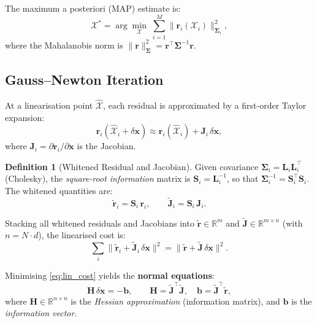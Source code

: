 \documentclass[11pt,a4paper]{article}
\newcommand{\bx}{\bm{x}}
\newcommand{\br}{\bm{r}}
\newcommand{\bb}{\bm{b}}
\newcommand{\bJ}{\bm{J}}
\newcommand{\bH}{\bm{H}}
\newcommand{\bSigma}{\bm{\Sigma}}
\newcommand{\R}{\mathbb{R}}
\theoremstyle{definition}
\newtheorem{definition}{Definition}[section]
\theoremstyle{plain}
\begin{document}
The maximum a posteriori (MAP) estimate is:
\begin{equation}
  \mathcal{X}^* = \arg\min_{\mathcal{X}} \;
    \sum_{i=1}^{M} \bigl\| \br_i(\mathcal{X}_i) \bigr\|^2_{\bSigma_i},
  \label{eq:map}
\end{equation}
where the Mahalanobis norm is
$\|\br\|^2_{\bSigma} = \br^\top \bSigma^{-1} \br$.

\subsection{Gauss--Newton Iteration}

At a linearisation point $\hat{\mathcal{X}}$, each residual is approximated
by a first-order Taylor expansion:
\begin{equation}
  \br_i(\hat{\mathcal{X}}_i + \delta\bx)
    \approx \br_i(\hat{\mathcal{X}}_i) + \bJ_i \, \delta\bx,
\end{equation}
where $\bJ_i = \partial \br_i / \partial \bx$ is the Jacobian.

\begin{definition}[Whitened Residual and Jacobian]
  Given covariance $\bSigma_i = \bm{L}_i \bm{L}_i^\top$ (Cholesky),
  the \emph{square-root information} matrix is
  $\bm{S}_i = \bm{L}_i^{-1}$, so that
  $\bSigma_i^{-1} = \bm{S}_i^\top \bm{S}_i$.
  The whitened quantities are:
  \begin{equation}
    \tilde{\br}_i = \bm{S}_i \, \br_i, \qquad
    \tilde{\bJ}_i = \bm{S}_i \, \bJ_i.
  \end{equation}
\end{definition}

Stacking all whitened residuals and Jacobians into $\tilde{\br} \in \R^m$
and $\tilde{\bJ} \in \R^{m \times n}$ (with $n = N \cdot d$), the
linearised cost is:
\begin{equation}
  \sum_i \| \tilde{\br}_i + \tilde{\bJ}_i \, \delta\bx \|^2
  = \| \tilde{\br} + \tilde{\bJ} \, \delta\bx \|^2.
  \label{eq:lin_cost}
\end{equation}

Minimising \eqref{eq:lin_cost} yields the \textbf{normal equations}:
\begin{equation}
  \boxed{
    \bH \, \delta\bx = -\bb, \qquad
    \bH = \tilde{\bJ}^\top \tilde{\bJ}, \quad
    \bb = \tilde{\bJ}^\top \tilde{\br},
  }
  \label{eq:normal}
\end{equation}
where $\bH \in \R^{n \times n}$ is the \emph{Hessian approximation}
(information matrix), and $\bb$ is the \emph{information vector}.
\end{document}
